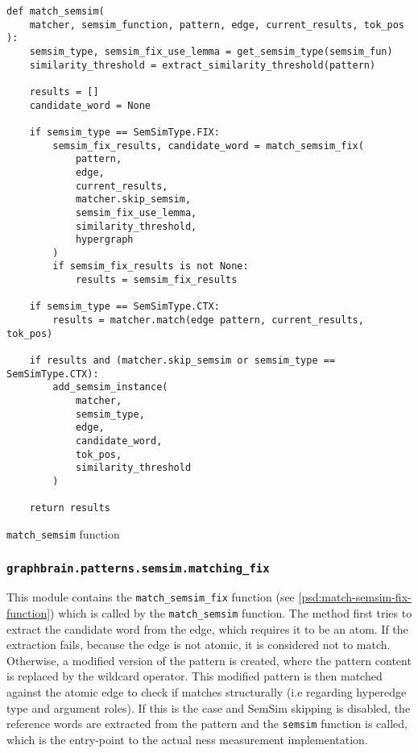 \documentclass[11pt, numbers=noenddot]{scrreprt}
\begin{document}
\begin{pseudo}
\begin{lstlisting}
def match_semsim(
    matcher, semsim_function, pattern, edge, current_results, tok_pos
):
    semsim_type, semsim_fix_use_lemma = get_semsim_type(semsim_fun)
    similarity_threshold = extract_similarity_threshold(pattern)

    results = []
    candidate_word = None   

    if semsim_type == SemSimType.FIX:
        semsim_fix_results, candidate_word = match_semsim_fix(
            pattern,
            edge,
            current_results,
            matcher.skip_semsim,
            semsim_fix_use_lemma,
            similarity_threshold,
            hypergraph
        )
        if semsim_fix_results is not None:
            results = semsim_fix_results

    if semsim_type == SemSimType.CTX:
        results = matcher.match(edge pattern, current_results, tok_pos)

    if results and (matcher.skip_semsim or semsim_type == SemSimType.CTX):
        add_semsim_instance(
            matcher, 
            semsim_type, 
            edge, 
            candidate_word, 
            tok_pos, 
            similarity_threshold
        )

    return results
\end{lstlisting}
\caption{\texttt{match\_semsim} function}
\label{psd:match-semsim-function}
\end{pseudo}


\subsubsection{\texttt{graphbrain.patterns.semsim.matching\_fix}}
\label{sec:graphbrain.patterns.semsim.matchingfix}
This module contains the \texttt{match\_semsim\_fix} function (see \cref{psd:match-semsim-fix-function}) which is called by the \texttt{match\_semsim} function.
The method first tries to extract the candidate word from the edge, which requires it to be an atom. If the extraction fails, because the edge is not atomic, it is considered not to match. Otherwise, a modified version of the pattern is created, where the pattern content is replaced by the wildcard operator. This modified pattern is then matched against the atomic edge to check if matches structurally (i.e regarding hyperedge type and argument roles). If this is the case and SemSim skipping is disabled, the reference words are extracted from the pattern and the \texttt{semsim} function is called, which is the entry-point to the actual \gls{ness} measurement implementation.
\end{document}
